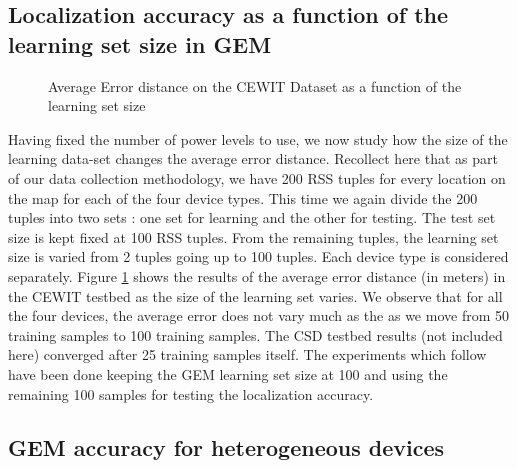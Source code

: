 \subsection{Localization accuracy as a function of the learning set size in GEM}
\label{subsec:localizationaccuracyasafunctionofthelearningsetsizeingem}

\begin{figure}[h!]
\centering
  \caption{Average Error distance on the CEWIT Dataset as a function of the learning set size}
  \label{fig:learningsetsizevserrordistance}
\end{figure}

Having fixed the number of power levels to use, we now study how the size of the learning data-set changes the average error distance. Recollect here that as part of our data collection methodology, we have 200 RSS tuples for every location on the map for each of the four device types. This time we again divide the 200 tuples into two sets : one set for learning and the other for testing. The test set size is kept fixed at 100 RSS tuples. From the remaining tuples, the learning set size is varied from 2 tuples going up to 100 tuples. Each device type is considered separately. Figure \ref{fig:learningsetsizevserrordistance} shows the results of the average error distance (in meters) in the CEWIT testbed as the size of the learning set varies. We observe that for all the four devices, the average error does not vary much as the as we move from 50 training samples to 100 training samples. The CSD testbed results (not included here) converged after 25 training samples itself. The experiments which follow have been done keeping the GEM learning set size at 100 and using the remaining 100 samples for testing the localization accuracy.  

\subsection{GEM accuracy for heterogeneous devices}
\label{subsec:gemaccuracyforheterogeneousdevices}

